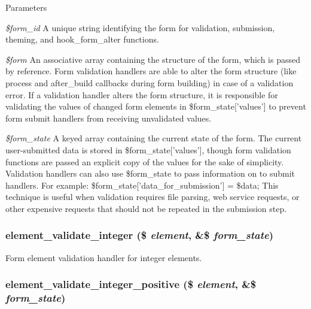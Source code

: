 \begin{DoxyParams}{Parameters}
\item[{\em \$form\_\-id}]A unique string identifying the form for validation, submission, theming, and hook\_\-form\_\-alter functions. \item[{\em \$form}]An associative array containing the structure of the form, which is passed by reference. Form validation handlers are able to alter the form structure (like process and after\_\-build callbacks during form building) in case of a validation error. If a validation handler alters the form structure, it is responsible for validating the values of changed form elements in \$form\_\-state\mbox{[}'values'\mbox{]} to prevent form submit handlers from receiving unvalidated values. \item[{\em \$form\_\-state}]A keyed array containing the current state of the form. The current user-\/submitted data is stored in \$form\_\-state\mbox{[}'values'\mbox{]}, though form validation functions are passed an explicit copy of the values for the sake of simplicity. Validation handlers can also use \$form\_\-state to pass information on to submit handlers. For example: \$form\_\-state\mbox{[}'data\_\-for\_\-submission'\mbox{]} = \$data; This technique is useful when validation requires file parsing, web service requests, or other expensive requests that should not be repeated in the submission step. \end{DoxyParams}
\hypertarget{group__form__api_ga6fffa62178c1fc94329e142b083e9b1c}{
\subsubsection[{element\_\-validate\_\-integer}]{\setlength{\rightskip}{0pt plus 5cm}element\_\-validate\_\-integer (\$ {\em element}, \/  \&\$ {\em form\_\-state})}}
\label{group__form__api_ga6fffa62178c1fc94329e142b083e9b1c}
Form element validation handler for integer elements. \hypertarget{group__form__api_gad8feb4fd6d8404783042cde1146f53cf}{
\subsubsection[{element\_\-validate\_\-integer\_\-positive}]{\setlength{\rightskip}{0pt plus 5cm}element\_\-validate\_\-integer\_\-positive (\$ {\em element}, \/  \&\$ {\em form\_\-state})}}
